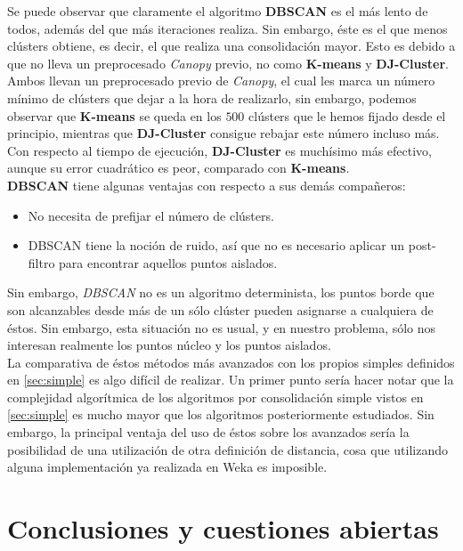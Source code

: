 \documentclass[a4paper, 12pt]{article}
\begin{document}
Se puede observar que claramente el algoritmo \textbf{DBSCAN} es el m\'as lento de todos, adem\'as del que m\'as iteraciones realiza. Sin embargo, \'este es el que menos cl\'usters obtiene, es decir, el que realiza una consolidaci\'on mayor. Esto es debido a que no lleva un preprocesado \textit{Canopy} previo, no como \textbf{K-means} y \textbf{DJ-Cluster}. Ambos llevan un preprocesado previo de \textit{Canopy}, el cual les marca un n\'umero m\'inimo de cl\'usters que dejar a la hora de realizarlo, sin embargo, podemos observar que \textbf{K-means} se queda en los $500$ cl\'usters que le hemos fijado desde el principio, mientras que \textbf{DJ-Cluster} consigue rebajar este n\'umero incluso m\'as. Con respecto al tiempo de ejecuci\'on, \textbf{DJ-Cluster} es much\'isimo m\'as efectivo, aunque su error cuadr\'atico es peor, comparado con \textbf{K-means}.\\

\textbf{DBSCAN} tiene algunas ventajas con respecto a sus dem\'as compa\~neros:

\begin{itemize}
	\item No necesita de prefijar el n\'umero de cl\'usters.
	\item DBSCAN tiene la noci\'on de ruido, as\'i que no es necesario aplicar un post-filtro para encontrar aquellos puntos aislados. 
\end{itemize}

Sin embargo, \textit{DBSCAN} no es un algoritmo determinista, los puntos borde que son alcanzables desde m\'as de un s\'olo cl\'uster pueden asignarse a cualquiera de \'estos. Sin embargo, esta situaci\'on no es usual, y en nuestro problema, s\'olo nos interesan realmente los puntos n\'ucleo y los puntos aislados. \\

La comparativa de \'estos m\'etodos m\'as avanzados con los propios simples definidos en \ref{sec:simple} es algo dif\'icil de realizar. Un primer punto ser\'ia hacer notar que la complejidad algor\'itmica de los algoritmos por consolidaci\'on simple vistos en \ref{sec:simple} es mucho mayor que los algoritmos posteriormente estudiados. Sin embargo, la principal ventaja del uso de \'estos sobre los avanzados ser\'ia la posibilidad de una utilizaci\'on de otra definici\'on de distancia, cosa que utilizando alguna implementaci\'on ya realizada en Weka es imposible.\\


\pagebreak
\section{Conclusiones y cuestiones abiertas}
\end{document}
